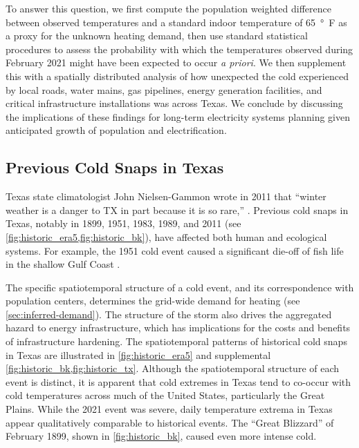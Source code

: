 \documentclass[12pt]{iopart}
\begin{document}
To answer this question, we first compute the population weighted difference between observed temperatures and a standard indoor temperature of \SI{65}{\degree F} as a proxy for the unknown heating demand, then use standard statistical procedures to assess the probability with which the temperatures observed during February 2021 might have been expected to occur \emph{a priori}.
We then supplement this with a spatially distributed analysis of how unexpected the cold experienced by local roads, water mains, gas pipelines, energy generation facilities, and critical infrastructure installations was across Texas.
We conclude by discussing the implications of these findings for long-term electricity systems planning given anticipated growth of population and electrification.

\subsection{Previous Cold Snaps in Texas}


Texas state climatologist John Nielsen-Gammon wrote in 2011 that ``winter weather is a danger to TX in part because it is so rare,'' \cite{nielsen-gammon_txacc:2011}.
Previous cold snaps in Texas, notably in 1899, 1951, 1983, 1989, and 2011 (see \cref{fig:historic_era5,fig:historic_bk}), have affected both human and ecological systems.
For example, the 1951 cold event caused a  significant die-off of fish life in the shallow Gulf Coast \cite{gunter_fishes:1951}.

The specific spatiotemporal structure of a cold event, and its correspondence with population centers, determines the grid-wide demand for heating (see \cref{sec:inferred-demand}).
The structure of the storm also drives the aggregated hazard to energy infrastructure, which has implications for the costs and benefits of infrastructure hardening.
The spatiotemporal patterns of historical cold snaps in Texas are illustrated in \cref{fig:historic_era5} and supplemental \cref{fig:historic_bk,fig:historic_tx}.
Although the spatiotemporal structure of each event is distinct, it is apparent that cold extremes in Texas tend to co-occur with cold temperatures across much of the United States, particularly the Great Plains.
While the 2021 event was severe, daily temperature extrema in Texas appear qualitatively comparable to historical events.
The ``Great Blizzard'' of February 1899, shown in \cref{fig:historic_bk}, caused even more intense cold.
\end{document}

